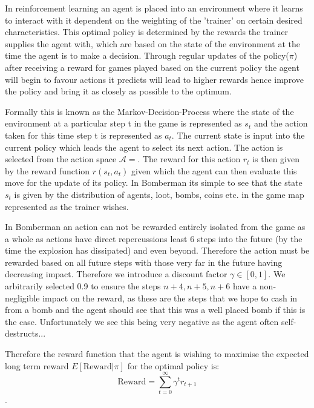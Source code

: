 In reinforcement learning an agent is placed into an environment where it learns to interact with it dependent on the weighting of the 'trainer' on certain desired characteristics. This optimal policy is determined by the rewards the trainer supplies the agent with, which are based on the state of the environment at the time the agent is to make a decision. Through regular updates of the policy($\pi$) after receiving a reward for games played based on the current policy the agent will begin to favour actions it predicts will lead to higher rewards hence improve the policy and bring it as closely as possible to the optimum.

Formally this is known as the Markov-Decision-Process where the state of the environment at a particular step t in the game is represented as $s_t$ and the action taken for this time step t is represented as $a_t$. The current state is input into the current policy which leads the agent to select its next action. The action is selected from the action space $\mathcal{A} = $. The reward for this action $r_t$ is then given by the reward function $r(s_t, a_t)$ given which the agent can then evaluate this move for the update of its policy. In Bomberman its simple to see that the state $s_t$ is given by the distribution of agents, loot, bombs, coins etc. in the game map represented as the trainer wishes. 

In Bomberman an action can not be rewarded entirely isolated from the game as a whole as actions have direct repercussions least 6 steps into the future (by the time the explosion has dissipated) and even beyond. Therefore the action must be rewarded based on all future steps with those very far in the future having decreasing impact. Therefore we introduce a discount factor $\gamma \in [0, 1]$. We arbitrarily selected 0.9 to ensure the steps $n+4, n+5, n+6$ have a non-negligible impact on the reward, as these are the steps that we hope to cash in from a bomb and the agent should see that this was a well placed bomb if this is the case. Unfortunately we see this being very negative as the agent often self-destructs...

Therefore the reward function that the agent is wishing to maximise the expected long term reward $E[\text{Reward}|\pi]$ for the optimal policy is: $$\text{Reward} = \sum_{t=0}^{\infty} \gamma^t r_{t+1}$$. 

